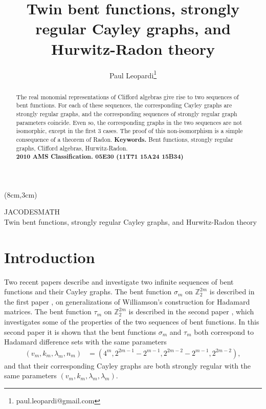\documentclass[11pt,a4paper]{jacodesmath}
\newcommand{\mb}[1]{\mathbb{#1}}
\newcommand{\Z}{\mb{Z}}
\begin{document}
\title{ \textbf{Twin bent functions, strongly regular Cayley graphs, and Hurwitz-Radon theory}}

\author[1]{Paul Leopardi\thanks{paul.leopardi@gmail.com}}
%

\maketitle
\begin{textblock*}{10cm} (8cm,3cm)
 \begin{center}JACODESMATH  \\
 \footnotesize Twin bent functions, strongly regular Cayley graphs, and Hurwitz-Radon theory
 \end{center}
\end{textblock*}

\begin{abstract}
%
The real monomial representations of Clifford algebras
give rise to two sequences of bent functions.
For each of these sequences, the corresponding Cayley graphs are
strongly regular graphs, and the corresponding sequences of strongly regular graph parameters
coincide.
Even so, the corresponding graphs in the two sequences are not isomorphic, except in the first 3
cases.
The proof of this non-isomorphism is a simple consequence of a theorem of Radon.
%
\textbf{Keywords.} Bent functions, strongly regular graphs, Clifford algebras, Hurwitz-Radon.
\\
\textbf{2010 AMS Classification. 05E30 (11T71 15A24 15B34) }

\end{abstract}

\section{Introduction}
\label{sec-Introduction}
Two recent papers \cite{Leo14Constructions,Leo15Twin} describe and investigate two infinite
sequences of bent functions and their Cayley graphs.
The bent function $\sigma_m$ on $\Z_2^{2 m}$ is described in the first paper
\cite{Leo14Constructions}, on
generalizations of Williamson's construction for Hada\-mard matrices.
The bent function $\tau_m$ on $\Z_2^{2 m}$ is described in the second paper \cite{Leo15Twin},
which investigates some of the properties of the two sequences of bent functions.
In this second paper it is shown that the bent functions $\sigma_m$ and $\tau_m$ both correspond to
Hada\-mard difference sets with the same parameters
\begin{align*}
(v_m,k_m,\lambda_m,n_m) &= (4^m, 2^{2 m - 1} - 2^{m-1}, 2^{2 m - 2} - 2^{m-1}, 2^{2 m - 2}),
\end{align*}
and that their corresponding Cayley graphs are both strongly regular with the same parameters
$(v_m,k_m,\lambda_m,\lambda_m)$.
\end{document}
